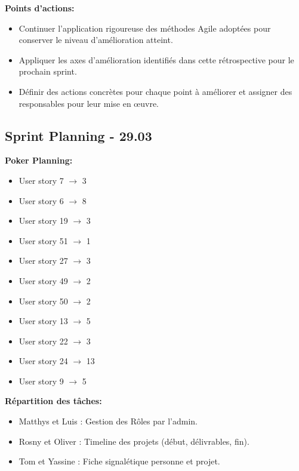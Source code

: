 \documentclass[11pt]{article}
\begin{document}
\textbf{Points d'actions:}
\begin{itemize}
  \item Continuer l'application rigoureuse des méthodes Agile adoptées pour conserver le niveau d'amélioration atteint.
  \item Appliquer les axes d'amélioration identifiés dans cette rétrospective pour le prochain sprint.
  \item Définir des actions concrètes pour chaque point à améliorer et assigner des responsables pour leur mise en œuvre.
\end{itemize}














\subsection*{{\color{navy}Sprint Planning - 29.03}}

\textbf{Poker Planning:}
\begin{itemize}
    \item User story 7 $\rightarrow$ 3
    \item User story 6 $\rightarrow$ 8
    \item User story 19 $\rightarrow$ 3
    \item User story 51 $\rightarrow$ 1
    \item User story 27 $\rightarrow$ 3
    \item User story 49 $\rightarrow$ 2
    \item User story 50 $\rightarrow$ 2
    \item User story 13 $\rightarrow$ 5
    \item User story 22 $\rightarrow$ 3
    \item User story 24 $\rightarrow$ 13
    \item User story 9 $\rightarrow$ 5
\end{itemize}

\textbf{Répartition des tâches:}
\begin{itemize}
    \item Matthys et Luis : Gestion des Rôles par l’admin.
    \item Rosny et Oliver : Timeline des projets (début, délivrables, fin).
    \item Tom et Yassine : Fiche signalétique personne et projet.
\end{itemize}
\end{document}
